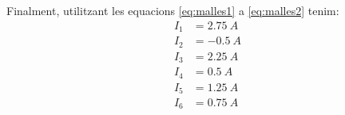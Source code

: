 \begin{exemple}
    Finalment, utilitzant les equacions \eqref{eq:malles1} a \eqref{eq:malles2} tenim:
    \begin{align*}
        I_1 &= \SI{2,75}{A} \\[0.5ex]
        I_2 &= \SI{-0,5}{A} \\[0.5ex]
        I_3 &= \SI{2,25}{A} \\[0.5ex]
        I_4 &= \SI{0,5}{A} \\[0.5ex]
        I_5 &=  \SI{1,25}{A} \\[0.5ex]
        I_6 &= \SI{0,75}{A}
    \end{align*}

\end{exemple}

